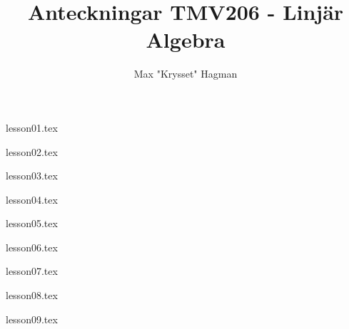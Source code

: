 \documentclass[a4paper]{report}
\title{Anteckningar TMV206 - Linjär Algebra}
\author{Max "Krysset" Hagman}
\begin{document}
    \newcommand{\prim}[1]{#1^{\prime}}

    \maketitle
    \tableofcontents


    {lesson01.tex}

    {lesson02.tex}

    {lesson03.tex}

    {lesson04.tex}

    {lesson05.tex}

    {lesson06.tex}

    {lesson07.tex}

    {lesson08.tex}

    {lesson09.tex}
\end{document}
